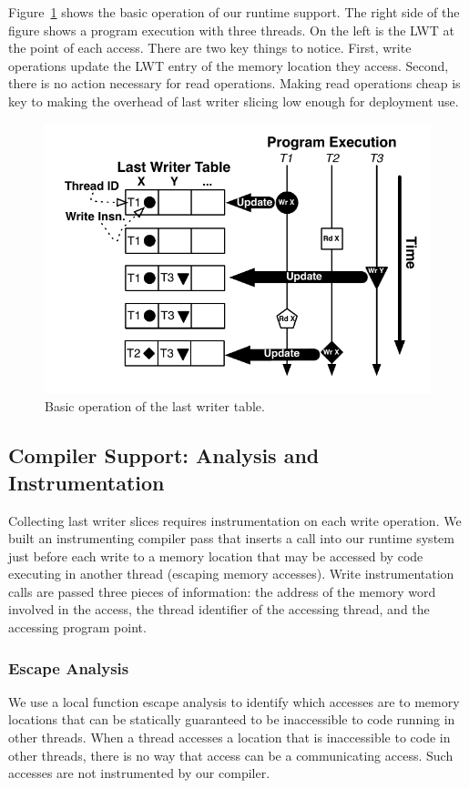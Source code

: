 \documentclass[preprint,9pt]{sigplanconf}
\newcommand{\lwt}{LWT\xspace}
\begin{document}
Figure~\ref{fig:basicLWT} shows the basic operation of our runtime support.
The right side of the figure shows a program execution with three threads.  On
the left is the \lwt at the point of each access.  There are two key things to
notice.  First, write operations update the \lwt entry of the memory location
they access.  Second, there is no action necessary for read operations.  Making
read operations cheap is key to making the overhead of last writer slicing low
enough for deployment use.

\begin{figure}[h]
\centering
\includegraphics[scale=.6]{figs/BasicLWT.pdf}
\caption{\label{fig:basicLWT}Basic operation of the last writer table. }
\end{figure}

\subsection{Compiler Support: Analysis and Instrumentation}
Collecting last writer slices requires instrumentation on each write operation.
We built an instrumenting compiler pass that inserts a call into our runtime
system just before each write to a memory location that may be accessed by code
executing in another thread (escaping memory accesses).  Write instrumentation
calls are passed three pieces of information: the address of the memory word
involved in the access, the thread identifier of the accessing thread, and the
accessing program point.   

\subsubsection{Escape Analysis}
We use a local function escape analysis to identify which accesses are to
memory locations that can be statically guaranteed to be inaccessible to code
running in other threads.  When a thread accesses a location that is
inaccessible to code in other threads, there is no way that access can be a
communicating access.  Such accesses are not instrumented by our compiler.  
\end{document}

